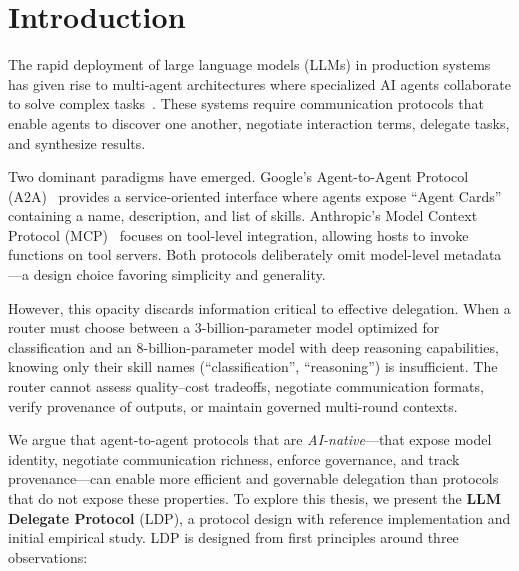 \documentclass[11pt,a4paper]{article}
\newcommand{\ldp}{\textsc{LDP}}
\newcommand{\atoa}{\textsc{A2A}}
\newcommand{\mcp}{\textsc{MCP}}
\begin{document}
\begin{abstract}
\medskip
\noindent\textbf{Keywords:} agent protocols, multi-agent systems, LLM delegation, payload negotiation, AI interoperability, trust domains
\end{abstract}


\section{Introduction}
\label{sec:intro}

The rapid deployment of large language models (LLMs) in production systems has given rise to multi-agent architectures where specialized AI agents collaborate to solve complex tasks~\citep{wu2023autogen, hong2023metagpt, li2023camel}.
These systems require communication protocols that enable agents to discover one another, negotiate interaction terms, delegate tasks, and synthesize results.

Two dominant paradigms have emerged. Google's Agent-to-Agent Protocol (\atoa{})~\citep{google2024a2a} provides a service-oriented interface where agents expose ``Agent Cards'' containing a name, description, and list of skills. Anthropic's Model Context Protocol (\mcp{})~\citep{anthropic2024mcp} focuses on tool-level integration, allowing hosts to invoke functions on tool servers. Both protocols deliberately omit model-level metadata---a design choice favoring simplicity and generality.

However, this opacity discards information critical to effective delegation.
When a router must choose between a 3-billion-parameter model optimized for classification and an 8-billion-parameter model with deep reasoning capabilities, knowing only their skill names (``classification'', ``reasoning'') is insufficient.
The router cannot assess quality--cost tradeoffs, negotiate communication formats, verify provenance of outputs, or maintain governed multi-round contexts.

We argue that agent-to-agent protocols that are \emph{AI-native}---that expose model identity, negotiate communication richness, enforce governance, and track provenance---can enable more efficient and governable delegation than protocols that do not expose these properties.
To explore this thesis, we present the \textbf{LLM Delegate Protocol} (\ldp{}), a protocol design with reference implementation and initial empirical study. \ldp{} is designed from first principles around three observations:
\end{document}
